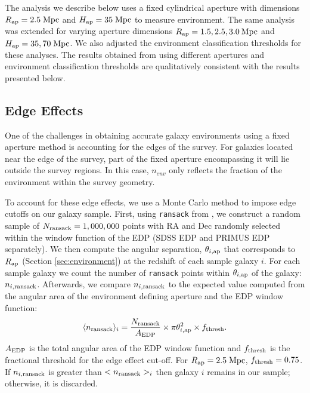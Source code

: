 \documentclass{emulateapj}
\def \apradius{2.5}
\def \apheight{35}
\begin{document}
The analysis we describe below uses a fixed cylindrical aperture with
dimensions $R_{\rm{ap}} = \apradius \; \rm{Mpc}$ and $H_{\rm{ap}} = \apheight
\;\rm{Mpc}$ to measure environment. The same analysis was
extended for varying aperture dimensions $R_{\rm{ap}} = 1.5, \apradius, 3.0 \:
\rm{Mpc}$ and $H_{\rm{ap}} = \apheight, 70 \;\rm{Mpc}$. We also
adjusted the environment classification thresholds for these
analyses. The results obtained from using different apertures and
environment classification thresholds are qualitatively consistent with the results presented below.  

\subsection{Edge Effects} \label{sec:edgeeffect}
One of the challenges in obtaining accurate galaxy environments using a fixed aperture method is accounting for the edges of the survey. For galaxies located near the edge of the survey, part of the fixed aperture encompassing it will lie outside the survey regions. In this case, $n_{env}$ only reflects the fraction of the environment within the survey geometry.

To account for these edge effects, we use a Monte Carlo method to impose edge cutoffs on our galaxy sample. First, using \texttt{ransack} from \cite{Swanson:2008aa}, we construct a random sample of  $N_{\rm{ransack}} = 1,000,000$ points with RA and Dec randomly selected within the window function of the EDP (SDSS EDP and PRIMUS EDP separately). We then compute the angular separation, $\theta_{i, \rm{ap}}$ that corresponds to $R_{\rm{ap}}$ (Section \ref{sec:environment}) at the redshift of each sample galaxy $i$. For each sample galaxy we count the number of \texttt{ransack} points within $\theta_{i, \rm{ap}}$ of the galaxy: $n_{i,\rm{ransack}}$. Afterwards, we compare $n_{i,\rm{ransack}}$ to the expected value computed from the angular area of the environment defining aperture and the EDP window function: 
\begin{equation} \label{eq:ransack}
\langle n_{\rm{ransack}}\rangle_{i} = \frac{N_{\rm{ransack}}}{A_{\rm{EDP}}}\times {\pi \theta_{i, \rm{ap}}^2} \times f_{\rm{thresh}}. 
\end{equation} 
$A_{\rm{EDP}}$ is the total angular area of the EDP window function and $f_{\rm{thresh}}$ is the fractional threshold for the edge effect cut-off. For $R_{\rm{ap}}= \apradius \;\rm{Mpc}$, $f_{\rm{thresh}} = 0.75$. If $n_{i, \rm{ransack}}$ is greater than $<n_{\rm{ransack}}>_i$ then galaxy $i$ remains in our sample; otherwise, it is discarded. 
\end{document}
